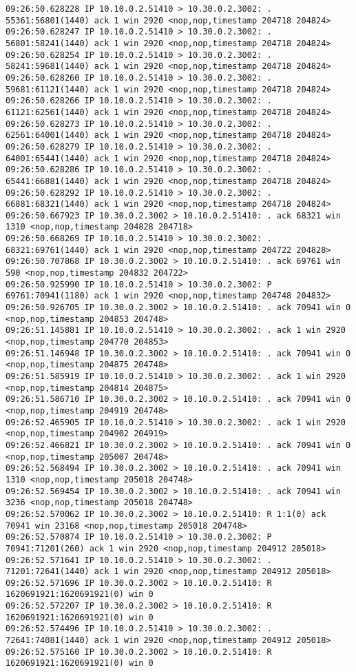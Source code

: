 \documentclass[a4paper,12pt]{article}
\begin{document}
\begin{Verbatim}
09:26:50.628228 IP 10.10.0.2.51410 > 10.30.0.2.3002: . 55361:56801(1440) ack 1 win 2920 <nop,nop,timestamp 204718 204824>
09:26:50.628247 IP 10.10.0.2.51410 > 10.30.0.2.3002: . 56801:58241(1440) ack 1 win 2920 <nop,nop,timestamp 204718 204824>
09:26:50.628254 IP 10.10.0.2.51410 > 10.30.0.2.3002: . 58241:59681(1440) ack 1 win 2920 <nop,nop,timestamp 204718 204824>
09:26:50.628260 IP 10.10.0.2.51410 > 10.30.0.2.3002: . 59681:61121(1440) ack 1 win 2920 <nop,nop,timestamp 204718 204824>
09:26:50.628266 IP 10.10.0.2.51410 > 10.30.0.2.3002: . 61121:62561(1440) ack 1 win 2920 <nop,nop,timestamp 204718 204824>
09:26:50.628273 IP 10.10.0.2.51410 > 10.30.0.2.3002: . 62561:64001(1440) ack 1 win 2920 <nop,nop,timestamp 204718 204824>
09:26:50.628279 IP 10.10.0.2.51410 > 10.30.0.2.3002: . 64001:65441(1440) ack 1 win 2920 <nop,nop,timestamp 204718 204824>
09:26:50.628286 IP 10.10.0.2.51410 > 10.30.0.2.3002: . 65441:66881(1440) ack 1 win 2920 <nop,nop,timestamp 204718 204824>
09:26:50.628292 IP 10.10.0.2.51410 > 10.30.0.2.3002: . 66881:68321(1440) ack 1 win 2920 <nop,nop,timestamp 204718 204824>
09:26:50.667923 IP 10.30.0.2.3002 > 10.10.0.2.51410: . ack 68321 win 1310 <nop,nop,timestamp 204828 204718>
09:26:50.668269 IP 10.10.0.2.51410 > 10.30.0.2.3002: . 68321:69761(1440) ack 1 win 2920 <nop,nop,timestamp 204722 204828>
09:26:50.707868 IP 10.30.0.2.3002 > 10.10.0.2.51410: . ack 69761 win 590 <nop,nop,timestamp 204832 204722>
09:26:50.925990 IP 10.10.0.2.51410 > 10.30.0.2.3002: P 69761:70941(1180) ack 1 win 2920 <nop,nop,timestamp 204748 204832>
09:26:50.926705 IP 10.30.0.2.3002 > 10.10.0.2.51410: . ack 70941 win 0 <nop,nop,timestamp 204853 204748>
09:26:51.145881 IP 10.10.0.2.51410 > 10.30.0.2.3002: . ack 1 win 2920 <nop,nop,timestamp 204770 204853>
09:26:51.146948 IP 10.30.0.2.3002 > 10.10.0.2.51410: . ack 70941 win 0 <nop,nop,timestamp 204875 204748>
09:26:51.585919 IP 10.10.0.2.51410 > 10.30.0.2.3002: . ack 1 win 2920 <nop,nop,timestamp 204814 204875>
09:26:51.586710 IP 10.30.0.2.3002 > 10.10.0.2.51410: . ack 70941 win 0 <nop,nop,timestamp 204919 204748>
09:26:52.465905 IP 10.10.0.2.51410 > 10.30.0.2.3002: . ack 1 win 2920 <nop,nop,timestamp 204902 204919>
09:26:52.466821 IP 10.30.0.2.3002 > 10.10.0.2.51410: . ack 70941 win 0 <nop,nop,timestamp 205007 204748>
09:26:52.568494 IP 10.30.0.2.3002 > 10.10.0.2.51410: . ack 70941 win 1310 <nop,nop,timestamp 205018 204748>
09:26:52.569454 IP 10.30.0.2.3002 > 10.10.0.2.51410: . ack 70941 win 3236 <nop,nop,timestamp 205018 204748>
09:26:52.570062 IP 10.30.0.2.3002 > 10.10.0.2.51410: R 1:1(0) ack 70941 win 23168 <nop,nop,timestamp 205018 204748>
09:26:52.570874 IP 10.10.0.2.51410 > 10.30.0.2.3002: P 70941:71201(260) ack 1 win 2920 <nop,nop,timestamp 204912 205018>
09:26:52.571641 IP 10.10.0.2.51410 > 10.30.0.2.3002: . 71201:72641(1440) ack 1 win 2920 <nop,nop,timestamp 204912 205018>
09:26:52.571696 IP 10.30.0.2.3002 > 10.10.0.2.51410: R 1620691921:1620691921(0) win 0
09:26:52.572207 IP 10.30.0.2.3002 > 10.10.0.2.51410: R 1620691921:1620691921(0) win 0
09:26:52.574496 IP 10.10.0.2.51410 > 10.30.0.2.3002: . 72641:74081(1440) ack 1 win 2920 <nop,nop,timestamp 204912 205018>
09:26:52.575160 IP 10.30.0.2.3002 > 10.10.0.2.51410: R 1620691921:1620691921(0) win 0
\end{Verbatim}
\end{document}
